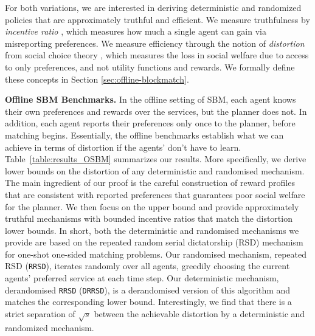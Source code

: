 \documentclass[letterpaper,11pt]{article}
\newcommand{\kibitz}[2]{\ifnum\Comments=1{\color{#1}{#2}}\fi}
\newcommand{\hau}[1]{\kibitz{blue}{[Hau: #1]}}
\begin{document}
For both variations, we are interested in deriving  deterministic and randomized policies that are approximately truthful and efficient. 
We measure truthfulness by \emph{incentive ratio} \cite{IR}, which measures how much a single agent can gain via misreporting preferences. We measure efficiency through the notion of \emph{distortion} from social choice theory \cite{PR06}, which measures the loss in social welfare due to access to only preferences, and not utility functions and rewards. We formally define these concepts in Section \ref{sec:offline-blockmatch}.

\textbf{Offline SBM Benchmarks.} In the offline setting of SBM, each agent knows their own preferences and rewards over the services, but the planner does not. In addition, each agent reports their preferences  only once to the planner, before matching begins. Essentially, the offline benchmarks establish what we can achieve in terms of distortion if the agents' don't have to learn.  Table~\ref{table:results_OSBM} summarizes our results.
More specifically, we derive  lower bounds on the distortion of any deterministic and randomised mechanism. The main ingredient of our proof is the careful construction of reward profiles that are consistent with reported preferences that guarantees poor social welfare for the planner. 
We then focus on the upper bound and provide approximately truthful mechanisms with bounded incentive ratios that match the distortion lower bounds. In short, both the deterministic and randomised mechanisms we provide are based on the repeated random serial dictatorship (RSD) mechanism for one-shot one-sided matching problems. Our randomised mechanism, repeated RSD (\texttt{RRSD}), iterates randomly over all agents, greedily choosing the current agents' preferred service at each time step. Our deterministic mechanism, derandomised \texttt{RRSD} (\texttt{DRRSD}), is a derandomised version of this algorithm and matches the corresponding lower bound. Interestingly, we find that there is a strict separation of $\sqrt{s}$ between the achievable distortion by a deterministic and randomized mechanism. %
\end{document}
